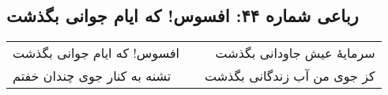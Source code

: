 \begin{center}
\section*{رباعی شماره ۴۴: افسوس! که ایام جوانی بگذشت}
\label{sec:044}
\begin{longtable}{l p{0.5cm} r}
افسوس! که ایام جوانی بگذشت
&&
سرمایهٔ عیش جاودانی بگذشت
\\
تشنه به کنار جوی چندان خفتم
&&
کز جوی من آب زندگانی بگذشت
\\
\end{longtable}
\end{center}
